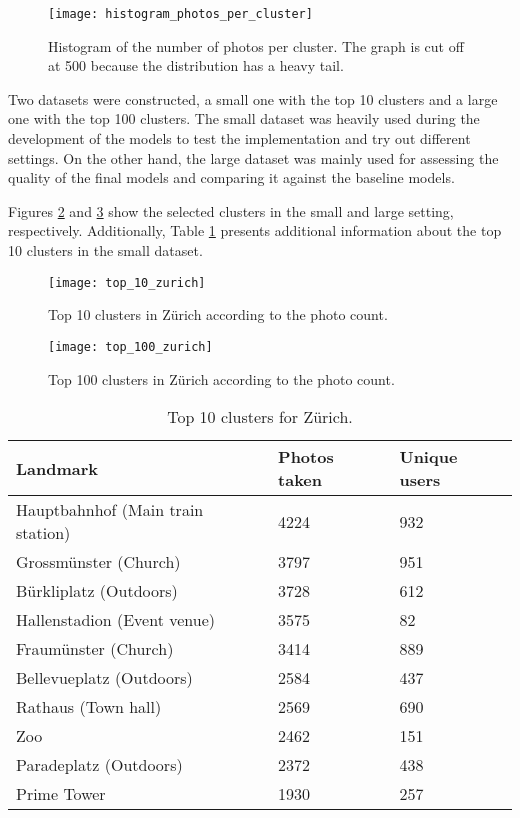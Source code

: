 \begin{figure}
  \centering
  \texttt{[image: histogram\_photos\_per\_cluster]}
  \caption{Histogram of the number of photos per cluster. The graph is cut off at 500 because the distribution has a heavy tail.}
  \label{fig:photos_per_clusters}
\end{figure}

Two datasets were constructed, a small one with the top 10 clusters and a large one with the top 100 clusters. The small dataset was heavily used during the development of the models to test the implementation and try out different settings. On the other hand, the large dataset was mainly used for assessing the quality of the final models and comparing it against the baseline models.

Figures \ref{fig:top_10_zurich} and \ref{fig:top_100_zurich} show the selected clusters in the small and large setting, respectively. Additionally, Table \ref{tab:top_10_clusters} presents additional information about the top 10 clusters in the small dataset.

\begin{figure}
  \centering
  \texttt{[image: top\_10\_zurich]}
  \caption{Top 10 clusters in Zürich according to the photo count.}
  \label{fig:top_10_zurich}
\end{figure}

\begin{figure}
  \centering
  \texttt{[image: top\_100\_zurich]}
  \caption{Top 100 clusters in Zürich according to the photo count.}
  \label{fig:top_100_zurich}
\end{figure}


\begin{table}
  \centering
  \caption{Top 10 clusters for Zürich.}
  \begin{tabular}{@{}lll@{}}
    \toprule
    Landmark & Photos taken & Unique users  \\
    \midrule
    Hauptbahnhof (Main train station) & 4224 & 932 \\
    Grossmünster (Church) & 3797 & 951 \\
    Bürkliplatz (Outdoors) & 3728 & 612 \\
    Hallenstadion (Event venue) & 3575 & 82 \\
    Fraumünster (Church) & 3414 & 889 \\
    Bellevueplatz (Outdoors) & 2584 & 437 \\
    Rathaus (Town hall) & 2569 & 690 \\
    Zoo & 2462 & 151 \\
    Paradeplatz (Outdoors) & 2372 & 438 \\
    Prime Tower & 1930 & 257 \\
    \bottomrule
  \end{tabular}
  \label{tab:top_10_clusters}
\end{table}

